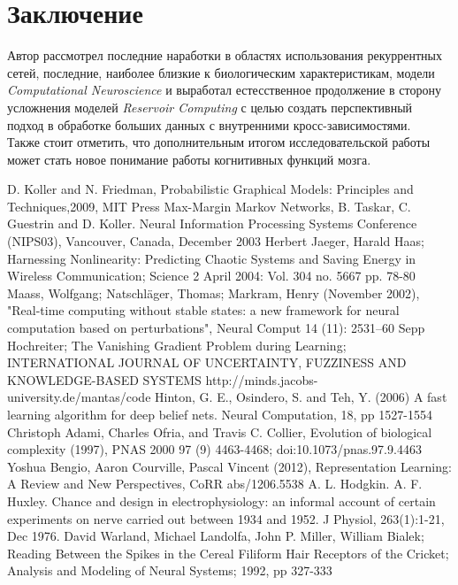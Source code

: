 \documentclass[a4paper,10pt]{article}
\begin{document}
\section{Заключение}
Автор рассмотрел последние наработки в областях использования рекуррентных сетей, последние, наиболее близкие к биологическим характеристикам, модели \textit{Computational Neuroscience} и выработал естесственное продолжение в сторону усложнения моделей \textit{Reservoir Computing} с целью создать перспективный подход в обработке больших данных с внутренними кросс-зависимостями.\\
\indent Также стоит отметить, что дополнительным итогом исследовательской работы может стать новое понимание работы когнитивных функций мозга. 
\newpage
{}
\begin{thebibliography}{9}
D. Koller and N. Friedman, Probabilistic Graphical Models: Principles and Techniques,2009, MIT Press
Max-Margin Markov Networks,  B. Taskar, C. Guestrin and D. Koller. Neural Information Processing Systems Conference (NIPS03), Vancouver, Canada, December 2003
Herbert Jaeger, Harald Haas; Harnessing Nonlinearity: Predicting Chaotic Systems and Saving Energy in Wireless Communication; 
Science 2 April 2004: Vol. 304 no. 5667 pp. 78-80 
Maass, Wolfgang; Natschläger, Thomas; Markram, Henry (November 2002), "Real-time computing without stable states: a new framework for neural computation based on perturbations", Neural Comput 14 (11): 2531–60
Sepp Hochreiter; The Vanishing Gradient Problem during Learning; INTERNATIONAL JOURNAL OF UNCERTAINTY, FUZZINESS AND KNOWLEDGE-BASED SYSTEMS
http://minds.jacobs-university.de/mantas/code
Hinton, G. E., Osindero, S. and Teh, Y. (2006)
A fast learning algorithm for deep belief nets.
Neural Computation, 18, pp 1527-1554
Christoph Adami, Charles Ofria, and Travis C. Collier, Evolution of biological complexity (1997), PNAS 2000 97 (9) 4463-4468; doi:10.1073/pnas.97.9.4463
Yoshua Bengio, Aaron Courville, Pascal Vincent (2012), Representation Learning: A Review and New Perspectives, CoRR abs/1206.5538 
A. L. Hodgkin. A. F. Huxley. Chance and design in electrophysiology: an informal account of certain experiments on nerve carried out between 1934 and 1952. J Physiol, 263(1):1-21, Dec 1976.
David Warland, Michael Landolfa, John P. Miller, William Bialek; Reading Between the Spikes in the Cereal Filiform Hair Receptors of the Cricket; Analysis and Modeling of Neural Systems; 1992, pp 327-333

\end{thebibliography}
\end{document}
